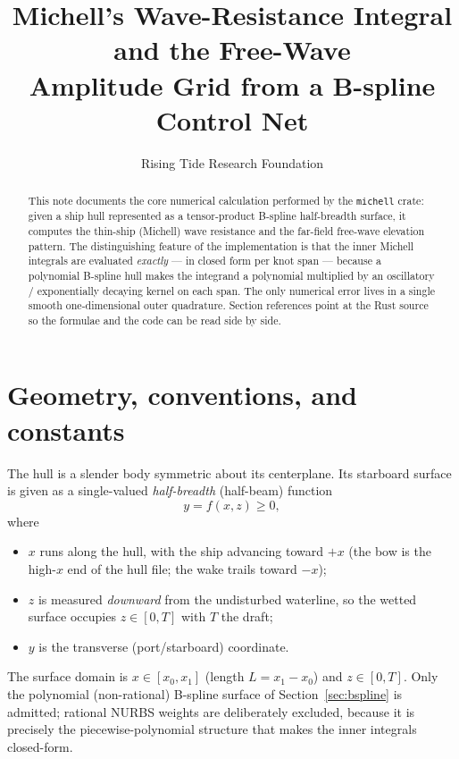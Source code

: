 \documentclass[11pt]{article}
\title{Michell's Wave-Resistance Integral and the Free-Wave\\
Amplitude Grid from a B-spline Control Net}
\author{Rising Tide Research Foundation}
\date{}
\begin{document}
\maketitle

\begin{abstract}
This note documents the core numerical calculation performed by the
\texttt{michell} crate: given a ship hull represented as a tensor-product
B-spline half-breadth surface, it computes the thin-ship (Michell) wave
resistance and the far-field free-wave elevation pattern. The distinguishing
feature of the implementation is that the inner Michell integrals are evaluated
\emph{exactly} --- in closed form per knot span --- because a polynomial
B-spline hull makes the integrand a polynomial multiplied by an oscillatory /
exponentially decaying kernel on each span. The only numerical error lives in a
single smooth one-dimensional outer quadrature. Section references point at the
Rust source so the formulae and the code can be read side by side.
\end{abstract}

\tableofcontents

\section{Geometry, conventions, and constants}
\label{sec:conventions}

The hull is a slender body symmetric about its centerplane. Its starboard
surface is given as a single-valued \emph{half-breadth} (half-beam) function
\begin{equation}
  y = f(x, z) \ge 0,
\end{equation}
where
\begin{itemize}
  \item $x$ runs along the hull, with the ship advancing toward $+x$ (the bow is
        the high-$x$ end of the hull file; the wake trails toward $-x$);
  \item $z$ is measured \emph{downward} from the undisturbed waterline, so the
        wetted surface occupies $z \in [0, T]$ with $T$ the draft;
  \item $y$ is the transverse (port/starboard) coordinate.
\end{itemize}
The surface domain is $x \in [x_0, x_1]$ (length $L = x_1 - x_0$) and
$z \in [0, T]$. Only the polynomial (non-rational) B-spline surface of
Section~\ref{sec:bspline} is admitted; rational NURBS weights are deliberately
excluded, because it is precisely the piecewise-polynomial structure that makes
the inner integrals closed-form.
\end{document}

